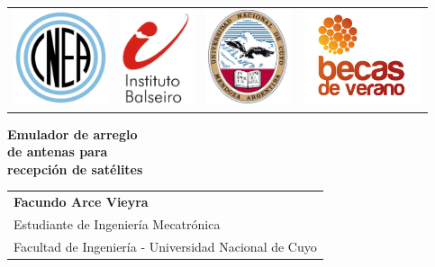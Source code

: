 \documentclass{article}
\newenvironment{standalone}{\begin{preview}}{\end{preview}}
\begin{document}
\begin{standalone}

  \begin{tabular*}{\textwidth}{@{\extracolsep{\fill}} cccc}
    \includegraphics[width=\linewidth/4, height=28mm, keepaspectratio]{../images/logo-cnea.png}&
    \includegraphics[width=\linewidth/4, height=28mm, keepaspectratio]{../images/logo-ib.jpg}&
    \includegraphics[width=\linewidth/4, height=28mm, keepaspectratio]{../images/logo-uncuyo.png}&
    \includegraphics[width=\linewidth/4, height=28mm, keepaspectratio]{../images/logo-bv.jpg}\\
  \end{tabular*}

  \vspace{4cm}

  \parbox{\textwidth}{
  \begin{center}
    \Huge \textbf{%
    Emulador de arreglo \\[1.2ex]
    de antenas para \\[1.2ex]
    recepción de satélites
    }
  \end{center}
  }

  \vfill

  {\fontsize{12}{12} \selectfont%
  \begin{tabular}{l}
    \textbf{Facundo Arce Vieyra}\\[1.0ex]
    Estudiante de Ingeniería Mecatrónica\\
    Facultad de Ingeniería - Universidad Nacional de Cuyo\\[1.0ex]
  \end{tabular}
  }\\


\end{standalone}
\end{document}
